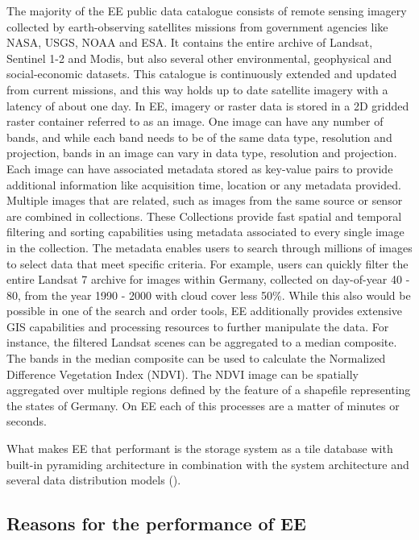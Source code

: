 The majority of the EE public data catalogue consists of remote sensing imagery collected by earth-observing satellites missions from government agencies like NASA, USGS, NOAA and ESA. It contains the entire archive of Landsat, Sentinel 1-2 and Modis, but also several other environmental, geophysical and social-economic datasets. This catalogue is continuously extended and updated from current missions, and this way holds up to date satellite imagery with a latency of about one day.
In EE, imagery or raster data is stored in a 2D gridded raster container referred to as an image. One image can have any number of bands, and while each band needs to be of the same data type, resolution and projection, bands in an image can vary in data type, resolution and projection. Each image can have associated metadata stored as key-value pairs to provide additional information like acquisition time, location or any metadata provided.
Multiple images that are related, such as images from the same source or sensor are combined in collections. These Collections provide fast spatial and temporal filtering and sorting capabilities using metadata associated to every single image in the collection. The metadata enables users to search through millions of images to select data that meet specific criteria. For example, users can quickly filter the entire Landsat 7 archive for images within Germany, collected on day-of-year 40 - 80, from the year 1990 - 2000 with cloud cover less 50\%. While this also would be possible in one of the search and order tools, EE additionally provides extensive GIS capabilities and processing resources to further manipulate the data.
For instance, the filtered Landsat scenes can be aggregated to a median composite. The bands in the median composite can be used to calculate the Normalized Difference Vegetation Index (NDVI). The NDVI image can be spatially aggregated over multiple regions defined by the feature of a shapefile representing the states of Germany. On EE each of this processes are a matter of minutes or seconds.

What makes EE that performant is the storage system as a tile database with built-in pyramiding architecture in combination with the system architecture and several data distribution models (\cite{gorelick2017google}).

\subsection{Reasons for the performance of EE}

